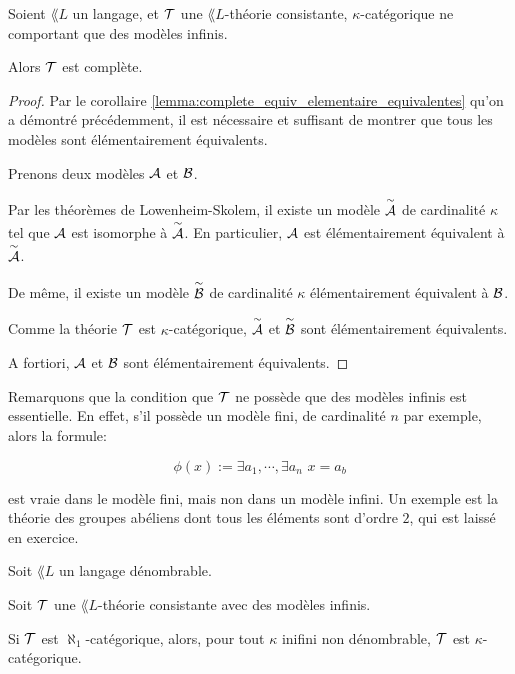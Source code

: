 \documentclass[a4paper, 12pt]{report}
\begin{document}
\begin{theorem} 
	\label{theorem:vaught}
	Soient $\lang{L}$ un langage, et $\mathcal{T}$ une $\lang{L}$-théorie
	consistante, $\kappa$-catégorique ne
	comportant que des modèles infinis.

	Alors $\mathcal{T}$ est complète.
\end{theorem}

\ifdefined\outputproof
\begin{proof}
	Par le corollaire \ref{lemma:complete_equiv_elementaire_equivalentes} qu'on
	a démontré précédemment, il est nécessaire et suffisant de montrer que tous
	les modèles sont élémentairement équivalents.

	Prenons deux modèles $\mathcal{A}$ et $\mathcal{B}$.

	Par les théorèmes de Lowenheim-Skolem, il existe un modèle
	$\mathcal{\overset{\sim}{A}}$ de cardinalité $\kappa$ tel que $\mathcal{A}$ est
	isomorphe à $\mathcal{\overset{\sim}{A}}$. En particulier, $\mathcal{A}$ est
	élémentairement équivalent à $\mathcal{\overset{\sim}{A}}$.

	De même, il existe un modèle $\mathcal{\overset{\sim}{B}}$ de cardinalité
	$\kappa$ élémentairement équivalent à $\mathcal{B}$.

	Comme la théorie $\mathcal{T}$ est $\kappa$-catégorique,
	$\mathcal{\overset{\sim}{A}}$ et $\mathcal{\overset{\sim}{B}}$ sont
	élémentairement équivalents.

	A fortiori, $\mathcal{A}$ et $\mathcal{B}$ sont élémentairement équivalents.
\end{proof}
\fi

Remarquons que la condition que $\mathcal{T}$ ne possède que des modèles infinis
est essentielle. En effet, s'il possède un modèle fini, de cardinalité $n$ par exemple, alors la formule:

\begin{equation}
	\phi(x) := \exists a_{1}, \cdots, \exists a_{n} \, \, x = a_{b}
\end{equation}

est vraie dans le modèle fini, mais non dans un modèle infini. Un exemple est
la théorie des groupes abéliens dont tous les éléments sont d'ordre $2$, qui est
laissé en exercice.

\begin{theorem} 
	Soit $\lang{L}$ un langage dénombrable.

	Soit $\mathcal{T}$ une $\lang{L}$-théorie consistante avec des modèles infinis.

	Si $\mathcal{T}$ est $\aleph_{1}$-catégorique, alors, pour tout $\kappa$
	inifini non dénombrable, $\mathcal{T}$ est $\kappa$-catégorique.
\end{theorem}
\end{document}
